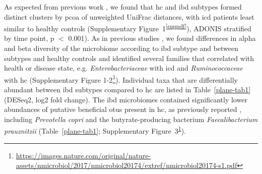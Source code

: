 As expected from previous work \cite{Gevers2014,Willing2010}, we found that \gls{hc} and \gls{ibd} subtypes formed distinct clusters by \gls{pcoa} of unweighted UniFrac distances, with \gls{icd} patients least similar to healthy controls (Supplementary Figure~1\textsuperscript{\ref{suppdf}}), ADONIS stratified by time point, p $<$ 0.001). As in previous studies \cite{ Rajca2014,Willing2010,Wills2014}, we found differences in alpha and beta diversity of the microbiome according to \gls{ibd} subtype and between subtypes and healthy controls and identified several families that correlated with health or disease state, e.g. \textit{Enterobacteriaceae} with \gls{icd} and \textit{Ruminococcaceae} with \gls{hc} (Supplementary Figure 1-2\footnote{\label{supPdf2}\url{https://images.nature.com/original/nature-assets/nmicrobiol/2017/nmicrobiol20174/extref/nmicrobiol20174-s1.pdf}}).  Individual taxa that are differentially abundant between \gls{ibd} subtypes compared to \gls{hc} are listed in Table~\ref{plane-tab1} (DESeq2, log2 fold change). The \gls{ibd} microbiomes contained significantly lower abundances of putative beneficial \glspl{otu} present in \gls{hc}, as previously reported \cite{Gevers2014,Rajca2014,Sokol2008,Willing2009,Willing2010,Wills2014}, including \textit{Prevotella copri} and the butyrate-producing bacterium \textit{Faecalibacterium prauznitzii} (Table~\ref{plane-tab1}; Supplementary Figure~3\textsuperscript{\ref{supPdf2}}).

